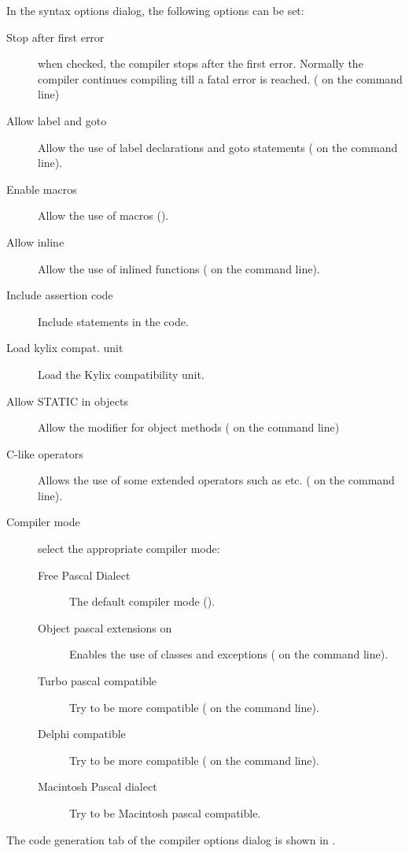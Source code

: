 In the syntax options dialog, the following options can be set:
\begin{description}
\item[Stop after first error]  when checked, the compiler stops after the
first error. Normally the compiler continues compiling till a fatal error is
reached. ( on the command line)
\item[Allow label and goto] Allow the use of label declarations and goto
statements ( on the command line).
\item[Enable macros] Allow the use of macros ().
\item[Allow inline] Allow the use of inlined functions ( on
the command line).
\item[Include assertion code] Include  statements in the code.
\item[Load kylix compat. unit] Load the Kylix compatibility unit.
\item[Allow STATIC in objects] Allow the  modifier for object
methods ( on the command line) 
\item[C-like operators]
Allows the use of some extended operators such as \var{+=, -=} etc.
( on the command line).
\item[Compiler mode] select the appropriate compiler mode:
\begin{description}
\item[Free Pascal Dialect] The default \fpc compiler mode ().
\item[Object pascal extensions on] 
Enables the use of classes and exceptions ( on the command line).
\item[Turbo pascal compatible] Try to be more \tp compatible ( on
the command line).
\item[Delphi compatible] Try to be more \delphi compatible ( on
the command line).
\item[Macintosh Pascal dialect] Try to be Macintosh pascal compatible.
\end{description}
\end{description}

The code generation tab of the compiler options dialog is shown in
.

